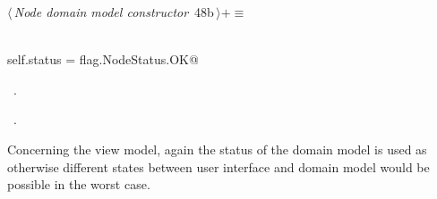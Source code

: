 \documentclass[
    a4paper,      %
    10pt,         %
    openright,    %
    notitlepage,  %
    parskip=half, %
]{scrreprt}       %
\theoremstyle{definition}                    %
\begin{document}
\begin{flushleft} \small
\begin{minipage}{\linewidth}\label{scrap67}\raggedright\small
{} $\langle\,${\itshape Node domain model constructor}\nobreak\ {\footnotesize {48b}}$\,\rangle+\equiv$
\vspace{-1ex}
\begin{list}{}{} \item
\mbox{}\lstinline@@\\
\mbox{}\lstinline@    self.status = flag.NodeStatus.OK@\\
\mbox{}\lstinline@@{\NWsep}
\end{list}
\vspace{-1.5ex}
\footnotesize
\begin{list}{}{\setlength{\itemsep}{-\parsep}\setlength{\itemindent}{-\leftmargin}}
\item \NWtxtMacroDefBy\ .
\item \NWtxtMacroRefIn\ .

\item{}
\end{list}
\end{minipage}\vspace{4ex}
\end{flushleft}
Concerning the view model, again the status of the domain model is used as
otherwise different states between user interface and domain model would be
possible in the worst case.
\end{document}
